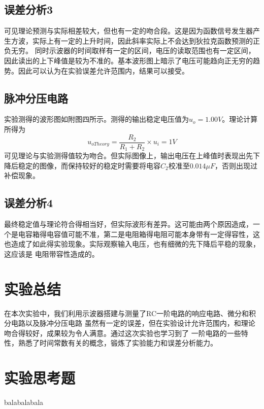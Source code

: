 \documentclass[a4paper,11pt,UTF8]{ctexart}
\begin{document}
\subsection{误差分析3}
可见理论预测与实际相差较大，但也有一定的吻合段。这是因为函数信号发生器产生方波，实际上有一定的上升时间，因此斜率实际上不会达到狄拉克函数预测的正负无穷。
同时示波器的时间取样有一定的区间，电压的读取范围也有一定区间，因此读出的上下峰值是较为不准的。基本波形图上暗示了电压可能趋向正无穷的趋势。因此可以认为在实验误差允许范围内，结果可以接受。
\subsection{脉冲分压电路}
实验测得的波形图如附图四所示。测得的输出稳定电压值为$u_o=1.00V$。理论计算所得为
\begin{equation}
  u_{oTheory}=\frac{R_2}{R_1+R_2}\times u_i=1V
\end{equation}
可见理论与实验测得值较为吻合。但实际图像上，输出电压在上峰值时表现出先下降后稳定的图像，而保持较好的稳定时需要将电容$C_2$校准至$0.014\mu F$，否则出现过补偿现象。
\subsection{误差分析4}
最终稳定值与理论符合得相当好，但实际波形有差异。这可能由两个原因造成，一个是电容箱得电容值可能不准，第二是电阻箱得电阻可能本身带有一定得容性，这也造成了如此得实验现象。实际观察输入电压，也有细微的先下降后平稳的现象，这应该是
电阻带容性造成的。
\section{实验总结}
在本次实验中，我们利用示波器搭建与测量了RC一阶电路的响应电路、微分和积分电路以及脉冲分压电路
虽然有一定的误差，但在实验设计允许范围内，和理论吻合得较好，成果较为令人满意。通过这次实验也学习到了
一阶电路的一些特性，熟悉了时间常数有关的概念，锻炼了实验能力和误差分析能力。
\newpage
\section{实验思考题}
balabalabala
\end{document}
